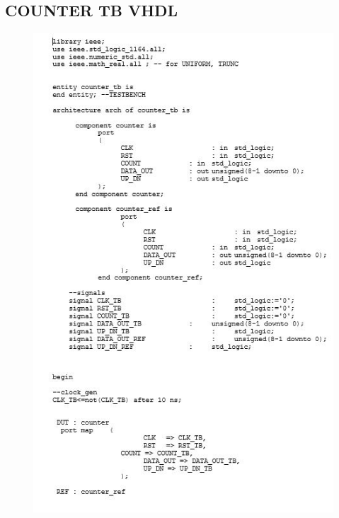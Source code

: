 \subsection{COUNTER TB VHDL}
\begin{figure}[!htb]
	\centering
	\includegraphics[scale=0.8]{immagini/counter_tb1}
	\label{counter_tb1}
\end{figure}
